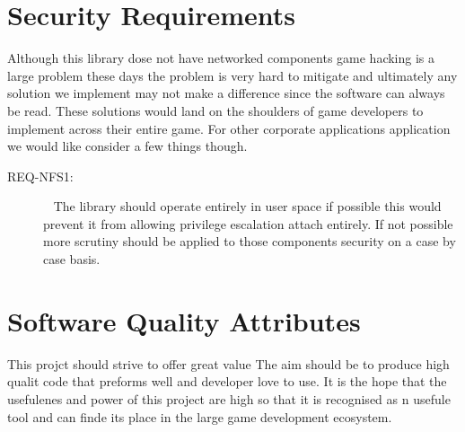 \documentclass{scrreprt}
\begin{document}

\section{Security Requirements}
Although this library dose not have networked components game hacking is a large problem these days the problem is very hard to mitigate and ultimately any solution we implement may not make a difference since the software can always be read.  These solutions would land on the shoulders of game developers to implement across their entire game.  For other corporate applications application we would like consider a few things though.
\begin{description}
\item [{REQ-NFS1:}]~ The library should operate entirely in user space if possible this would prevent it from allowing privilege escalation attach entirely.  If not possible more scrutiny should be applied to those components security on a case by case basis.


\end{description}


\section{Software Quality Attributes}
This projct should strive to offer great value  The aim should be to produce high qualit code that preforms well and developer love to use.  It is the hope that the usefulenes and power of this project are high so that it is recognised as n usefule tool and can finde its place in the large game development ecosystem.
\end{document}
